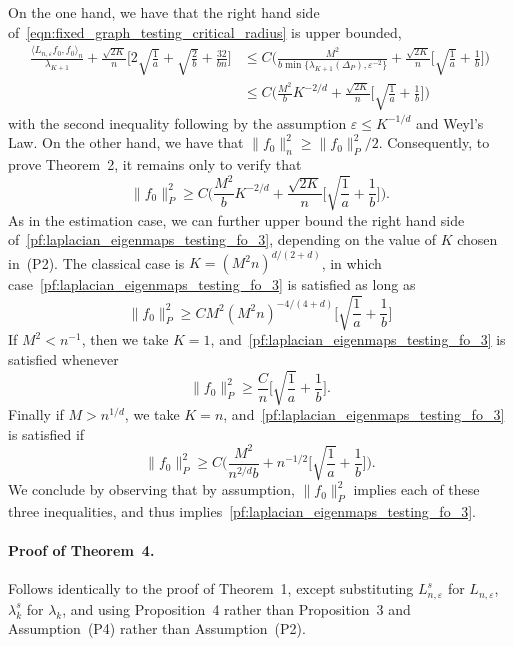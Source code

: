 \documentclass[aos]{imsart}
\theoremstyle{plain}
\theoremstyle{definition}
\theoremstyle{remark}
\newcommand{\dotp}[2]{\langle #1, #2 \rangle}
\newcommand{\1}{\mathbf{1}}
\begin{document}
On the one hand, we have that the right hand side of~\eqref{eqn:fixed_graph_testing_critical_radius} is upper bounded, 
\begin{align*}
\frac{\dotp{L_{n,\varepsilon}f_0}{f_0}_n}{\lambda_{K + 1}} + \frac{\sqrt{2K}}{n}\biggl[2\sqrt{\frac{1}{a}} + \sqrt{\frac{2}{b}} + \frac{32}{bn}\biggr] & \leq C\biggl(\frac{M^2}{b \min\{\lambda_{K+1}(\Delta_P), \varepsilon^{-2}\}} + \frac{\sqrt{2K}}{n}\biggl[\sqrt{\frac{1}{a}} + \frac{1}{b}\biggr]\biggr) \\
& \leq C\biggl(\frac{M^2}{b}K^{-2/d} + \frac{\sqrt{2K}}{n}\biggl[\sqrt{\frac{1}{a}} + \frac{1}{b}\biggr]\biggr)
\end{align*}
with the second inequality following by the assumption $\varepsilon \leq K^{-1/d}$ and Weyl's Law. On the other hand, we have that $\|f_0\|_n^2 \geq \|f_0\|_P^2/2$. Consequently, to prove Theorem~2, it remains only to verify that
\begin{equation}
\label{pf:laplacian_eigenmaps_testing_fo_3}
\|f_0\|_P^2 \geq C\biggl(\frac{M^2}{b}K^{-2/d} + \frac{\sqrt{2K}}{n}\biggl[\sqrt{\frac{1}{a}} + \frac{1}{b}\biggr]\biggr).
\end{equation}
As in the estimation case, we can further upper bound the right hand side of~\eqref{pf:laplacian_eigenmaps_testing_fo_3}, depending on the value of $K$ chosen in~(P2). The classical case is $K = (M^2n)^{d/(2 + d)}$, in which case~\eqref{pf:laplacian_eigenmaps_testing_fo_3} is satisfied as long as
\begin{equation*}
\|f_0\|_P^2 \geq CM^2(M^2n)^{-4/(4 + d)}\biggl[\sqrt{\frac{1}{a}} + \frac{1}{b}\biggr]
\end{equation*}
If $M^2 < n^{-1}$, then we take $K = 1$, and~\eqref{pf:laplacian_eigenmaps_testing_fo_3} is satisfied whenever
\begin{equation*}
\|f_0\|_P^2 \geq \frac{C}{n}\biggl[\sqrt{\frac{1}{a}} + \frac{1}{b}\biggr].
\end{equation*}
Finally if $M > n^{1/d}$, we take $K = n$, and~\eqref{pf:laplacian_eigenmaps_testing_fo_3} is satisfied if
\begin{equation*}
\|f_0\|_P^2 \geq C\biggl(\frac{M^2}{n^{2/d}b} + n^{-1/2}\biggl[\sqrt{\frac{1}{a}} + \frac{1}{b}\biggr]\biggr).
\end{equation*}
We conclude by observing that by assumption, $\|f_0\|_P^2$ implies each of these three inequalities, and thus implies~\eqref{pf:laplacian_eigenmaps_testing_fo_3}.

\paragraph{Proof of Theorem~4.}
Follows identically to the proof of Theorem~1, except substituting $L_{n,\varepsilon}^s$ for $L_{n,\varepsilon}$, $\lambda_k^s$ for $\lambda_k$, and using Proposition~4 rather than Proposition~3 and Assumption~(P4) rather than Assumption~(P2).
\end{document}

